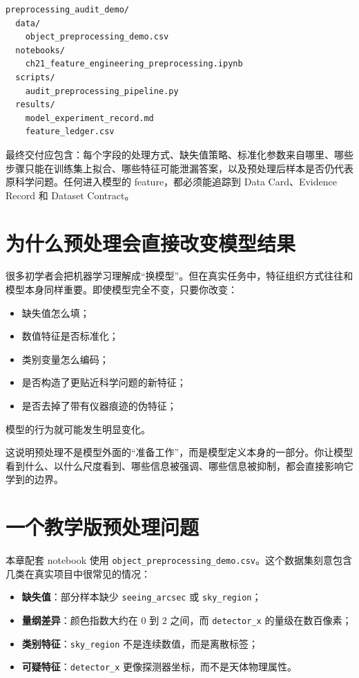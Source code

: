 \begin{examplebox}[最小预处理项目结构]
\begin{lstlisting}[style=terminal]
preprocessing_audit_demo/
  data/
    object_preprocessing_demo.csv
  notebooks/
    ch21_feature_engineering_preprocessing.ipynb
  scripts/
    audit_preprocessing_pipeline.py
  results/
    model_experiment_record.md
    feature_ledger.csv
\end{lstlisting}
\end{examplebox}

最终交付应包含：每个字段的处理方式、缺失值策略、标准化参数来自哪里、哪些步骤只能在训练集上拟合、哪些特征可能泄漏答案，以及预处理后样本是否仍代表原科学问题。任何进入模型的 feature，都必须能追踪到 Data Card、Evidence Record 和 Dataset Contract。

\section{为什么预处理会直接改变模型结果}

很多初学者会把机器学习理解成“换模型”。但在真实任务中，特征组织方式往往和模型本身同样重要。即使模型完全不变，只要你改变：

\begin{itemize}
    \item 缺失值怎么填；
    \item 数值特征是否标准化；
    \item 类别变量怎么编码；
    \item 是否构造了更贴近科学问题的新特征；
    \item 是否去掉了带有仪器痕迹的伪特征；
\end{itemize}

模型的行为就可能发生明显变化。

这说明预处理不是模型外面的“准备工作”，而是模型定义本身的一部分。你让模型看到什么、以什么尺度看到、哪些信息被强调、哪些信息被抑制，都会直接影响它学到的边界。

\section{一个教学版预处理问题}

本章配套 notebook 使用 \nolinkurl{object_preprocessing_demo.csv}。这个数据集刻意包含几类在真实项目中很常见的情况：

\begin{itemize}
    \item \textbf{缺失值}：部分样本缺少 \texttt{seeing\_arcsec} 或 \texttt{sky\_region}；
    \item \textbf{量纲差异}：颜色指数大约在 $0$ 到 $2$ 之间，而 \texttt{detector\_x} 的量级在数百像素；
    \item \textbf{类别特征}：\texttt{sky\_region} 不是连续数值，而是离散标签；
    \item \textbf{可疑特征}：\texttt{detector\_x} 更像探测器坐标，而不是天体物理属性。
\end{itemize}


